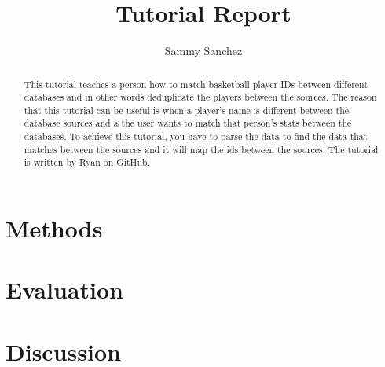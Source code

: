 \documentclass[10pt,twocolumn]{article}
\title{Tutorial Report}
\author{Sammy Sanchez}
\affiliation{Occidental College}
\begin{document}
\maketitle

\begin{abstract}

This tutorial teaches a person how to match basketball player IDs between different databases and in other words deduplicate the players between the sources. The reason that this tutorial can be useful is when a player's name is different between the database sources and a the user wants to match that person's stats between the databases. To achieve this tutorial, you have to parse the data to find the data that matches between the sources and it will map the ids between the sources. The tutorial is written by Ryan \textcite{Tutorial} on GitHub.

\end{abstract}

\section{Methods}


\section{Evaluation}

\section{Discussion}



\printbibliography 
\end{document}
